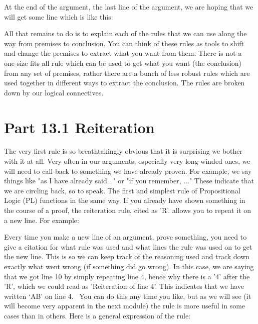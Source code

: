 At the end of the argument, the last line of the argument, we are hoping that we will get some line which is like this:

\begin{fitchproof}
\end{fitchproof}

All that remains to do is to explain each of the rules that we can use along the way from premises to conclusion. You can think of these rules as tools to shift and change the premises to extract what you want from them. There is not a one-size fits all rule which can be used to get what you want (the conclusion) from any set of premises, rather there are a bunch of less robust rules which are used together in different ways to extract the conclusion. The rules are broken down by our logical connectives.
\section{Part 13.1 Reiteration}
The very first rule is so breathtakingly obvious that it is surprising we bother with it at all. Very often in our arguments, especially very long-winded ones, we will need to call-back to something we have already proven. For example, we say things like "as I have already said..." or "if you remember, ..." These indicate that we are circling back, so to speak. The first and simplest rule of Propositional Logic (PL) functions in the same way. If you already have shown something in the course of a proof, the reiteration rule, cited as 'R'. allows you to repeat it on a new line. For example:

\begin{fitchproof}
\ellipsesline
{} 
\end{fitchproof}

Every time you make a new line of an argument, prove something, you need to give a citation for what rule was used and what lines the rule was used on to get the new line. This is so we can keep track of the reasoning used and track down exactly what went wrong (if something did go wrong). In this case, we are saying that we got line 10 by simply repeating line 4, hence why there is a '4' after the 'R', which we could read as 'Reiteration of line 4'. This indicates that we have written ‘A\eand B’ on line 4.  You can do this any time you like, but as we will see (it will become very apparent in the next module) the rule is more useful in some cases than in others. Here is a general expression of the rule:

